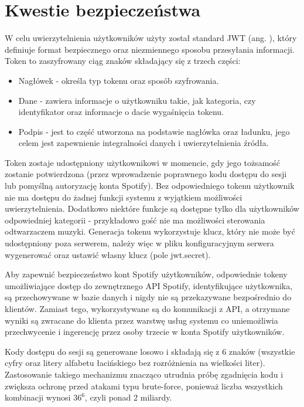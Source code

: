 \section{Kwestie bezpieczeństwa}
W celu uwierzytelnienia użytkowników użyty został standard JWT (ang. ), który definiuje format bezpiecznego oraz niezmiennego sposobu przesyłania informacji. Token to zaszyfrowany ciąg znaków składający się z trzech części: 
\begin{itemize}
\item Nagłówek - określa typ tokenu oraz sposób szyfrowania.
\item Dane - zawiera informacje o użytkowniku takie, jak kategoria, czy identyfikator oraz informacje o dacie wygaśnięcia tokenu.
\item Podpis - jest to część utworzona na podstawie nagłówka oraz ładunku, jego celem jest zapewnienie integralności danych i uwierzytelnienia źródła.
\end{itemize}

Token zostaje udostępniony użytkownikowi w momencie, gdy jego tożsamość zostanie potwierdzona (przez wprowadzenie poprawnego kodu dostępu do sesji lub pomyślną autoryzację konta Spotify). Bez odpowiedniego tokenu użytkownik nie ma dostępu do żadnej funkcji systemu z wyjątkiem możliwości uwierzytelnienia. Dodatkowo niektóre funkcje są dostępne tylko dla użytkowników odpowiedniej kategorii - przykładowo gość nie ma możliwości sterowania odtwarzaczem muzyki. Generacja tokenu wykorzystuje klucz, który nie może być udostępniony poza serwerem, należy więc w pliku konfiguracyjnym serwera wygenerować oraz ustawić własny klucz (pole jwt.secret).

Aby zapewnić bezpieczeństwo kont Spotify użytkowników, odpowiednie tokeny umożliwiające dostęp do zewnętrznego API Spotify, identyfikujące użytkownika, są przechowywane w bazie danych i nigdy nie są przekazywane bezpośrednio do klientów. Zamiast tego, wykorzystywane są do komunikacji z API, a otrzymane wyniki są zwracane do klienta przez warstwę usług systemu co uniemożliwia przechwycenie i ingerencję przez osoby trzecie w konta Spotify użytkowników.

Kody dostępu do sesji są generowane losowo i składają się z 6 znaków (wszystkie cyfry oraz litery alfabetu łacińskiego bez rozróżnienia na wielkości liter). Zastosowanie takiego mechanizmu znacząco utrudnia próbę zgadnięcia kodu i zwiększa ochronę przed atakami typu brute-force, ponieważ liczba wszystkich kombinacji wynosi $36^6$, czyli ponad 2 miliardy.

